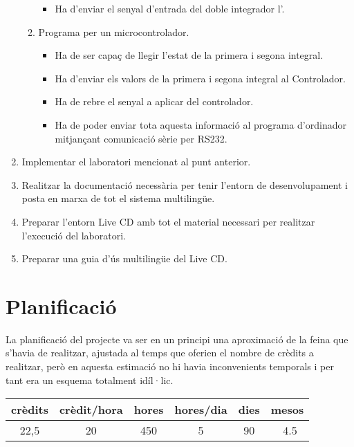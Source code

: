 \begin{enumerate}
\begin{enumerate}
\begin{itemize}
					\item Ha d'enviar el senyal d'entrada del doble integrador l'\Actuador.
				\end{itemize}
			\item Programa \SensorActuador per un microcontrolador.
				\begin{itemize}
					\item Ha de ser capaç de llegir l'estat de la primera i segona integral.
					\item Ha d'enviar els valors de la primera i segona integral al Controlador.
					\item Ha de rebre el senyal a aplicar del controlador.
					\item Ha de poder enviar tota aquesta informació al programa d'ordinador mitjançant comunicació sèrie per RS232.
				\end{itemize}
		\end{enumerate}
	\item Implementar el laboratori mencionat al punt anterior.
	\item Realitzar la documentació necessària per tenir l'entorn de desenvolupament i posta en marxa de tot el sistema multilingüe.
	\item Preparar l'entorn Live CD amb tot el material necessari per realitzar l'execució del laboratori.
	\item Preparar una guia d'ús multilingüe del Live CD.
\end{enumerate}



\section{Planificació}\label{cap:int:plan}

La planificació del projecte va ser en un principi una aproximació de la feina que s'havia de realitzar, ajustada al temps que oferien el nombre de crèdits a realitzar, però en aquesta estimació no hi havia inconvenients temporals i per tant era un esquema totalment idíl·lic.

\begin{center}
	\begin{tabular}{ c | c | c | c | c | c }
		\textbf{crèdits} & \textbf{crèdit/hora} & \textbf{hores} & \textbf{hores/dia} & \textbf{dies} & \textbf{mesos}\\
		\hline
		22,5 & 20 & 450 & 5 & 90 & ~4.5\\
		\hline
	\end{tabular}
	\label{tab:int:plan:est:temps}
\end{center}

